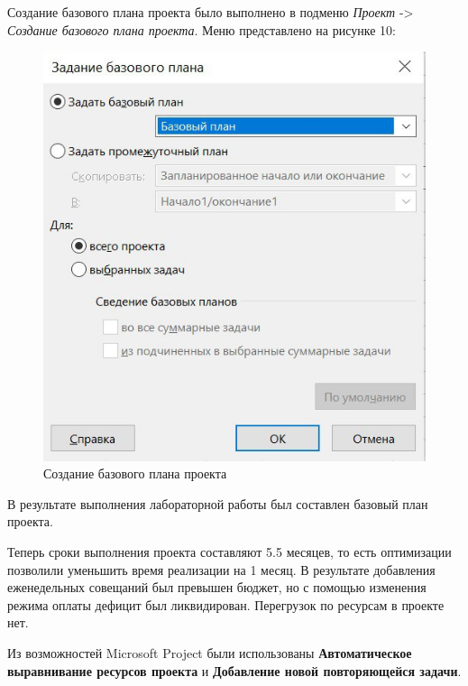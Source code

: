 \newpage
Создание базового плана проекта было выполнено в подменю \textit{Проект} -> \textit{Создание базового плана проекта}.
Меню представлено на рисунке 10:
\FloatBarrier
\begin{figure}[h]	
	\begin{center}
		\includegraphics[width=\linewidth]{inc/4-4.jpeg}
	\end{center}
	\captionsetup{justification=centering}
	\caption{Создание базового плана проекта}
\end{figure}
\FloatBarrier 

В результате выполнения лабораторной работы был составлен базовый план проекта.

Теперь сроки выполнения проекта составляют 5.5 месяцев, то есть оптимизации позволили уменьшить время реализации на 1 месяц.
В результате добавления еженедельных совещаний был превышен бюджет, но с помощью изменения режима оплаты дефицит был ликвидирован.
Перегрузок по ресурсам в проекте нет.

Из возможностей Microsoft Project были использованы \textbf{Автоматическое выравнивание ресурсов проекта} и \textbf{Добавление новой повторяющейся задачи}.